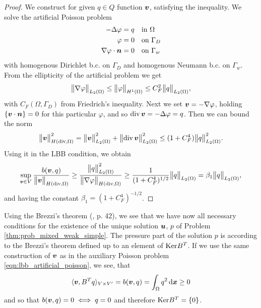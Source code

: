\begin{proof}
We construct for given $q\in Q$ function $\mathbf{\boldsymbol{v}}$, satisfying the inequality.
We solve the artificial Poisson problem
\begin{equation} \label{eqn:lbb_artificial_poisson}  
\begin{aligned}
    -\Delta\varphi &= q && \textrm{in } \Omega\\
    \varphi &= 0 && \textrm{on } \Gamma_D \\
    \nabla\varphi\cdot\mathbf{\boldsymbol{n}} &= 0 && \textrm{on } \Gamma_w
\end{aligned}
\end{equation}
with homogenous Dirichlet b.c. on $\Gamma_D$ and homogenous Neumann b.c. on $\Gamma_w$.
From the ellipticity of the artificial problem we get
\begin{equation}
    \bigl\Vert\nabla\varphi\bigr\Vert_{L_2(\Omega)} \leq \bigl\Vert\varphi\bigr\Vert_{H^1(\Omega)}
        \leq C_F^2 \bigl\Vert q\bigr\Vert_{L_2(\Omega)},
\end{equation}
with $C_F(\Omega,\Gamma_D)$ from Friedrich's inequality.
Next we set $\mathbf{\boldsymbol{v}} = -\nabla \varphi$, holding $\{\mathbf{\boldsymbol{v}}\cdot\mathbf{\boldsymbol{n}}\}=0$ for this particular $\varphi$,
and so ${\rm div}\,\mathbf{\boldsymbol{v}} = -\Delta\varphi=q$. Then we can bound the norm
\begin{equation}
    \bigl\Vert\mathbf{\boldsymbol{v}}\bigr\Vert^2_{H({\rm div},\Omega)} = \bigl\Vert\mathbf{\boldsymbol{v}}\bigr\Vert^2_{L_2(\Omega)} 
        + \bigl\Vert{\rm div}\,\mathbf{\boldsymbol{v}}\bigr\Vert^2_{L_2(\Omega)}
        \leq (1+C_F^4) \bigl\Vert q\bigr\Vert^2_{L_2(\Omega)}.
\end{equation}
Using it in the LBB condition, we obtain
\begin{equation} \label{eqn:form_b_lbb_proof}
    \sup_{\mathbf{\boldsymbol{v}}\in V} \frac{b(\mathbf{\boldsymbol{v}},q)}{\bigl\Vert\mathbf{\boldsymbol{v}}\bigr\Vert_{H({\rm div},\Omega)}} \geq
    \frac{\bigl\Vert q\bigr\Vert^2_{L_2(\Omega)}}{\bigl\Vert\nabla\varphi\bigr\Vert_{H({\rm div},\Omega)}}
    \geq \frac{1}{(1+C_F^4)^{1/2}} \bigl\Vert q\bigr\Vert_{L_2(\Omega)} = \beta_1 \bigl\Vert q\bigr\Vert_{L_2(\Omega)},
\end{equation}
and having the constant $\beta_1 = (1+C_F^4)^{-1/2}$.
\end{proof}

Using the Brezzi's theorem (\cite{brezzi_mixed_1991}, p. 42), we see that we have now
all necessary conditions for the existence of the unique solution $\mathbf{\boldsymbol{u}}$, $p$ of Problem \eqref{thm:prob_mixed_weak_simple}.
The pressure part of the solution $p$ is according to the Brezzi's theorem defined up to an element of $\textrm{Ker} B^T$.
If we use the same construction of $\mathbf{\boldsymbol{v}}$ as in the auxiliary Poisson problem \eqref{eqn:lbb_artificial_poisson},
we see, that
\[
    \langle \mathbf{\boldsymbol{v}}, B^T q \rangle_{V\times V'} = b(\mathbf{\boldsymbol{v}},q) = \int_\Omega q^2 \,{\rm d}\mathbf{\boldsymbol{x}} \geq 0
\]
and so that $b(\mathbf{\boldsymbol{v}},q) = 0 \iff q=0$ and therefore $\textrm{Ker} B^T=\{0\}$.

